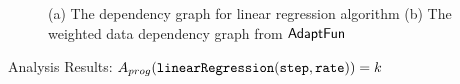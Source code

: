 \begin{example}
\begin{figure}
    \begin{subfigure}{0.3\textwidth}
    \begin{centering}
    \begin{tikzpicture}[scale=\textwidth/16cm,samples=200]
\end{tikzpicture}
    \caption{}
    \end{centering}
    \end{subfigure}
    \vspace{-0.4cm}
    \caption{(a) The dependency graph for linear regression algorithm 
    (b) The weighted data dependency graph from $\THESYSTEM$}
    \vspace{-0.2cm}
    \label{fig:linear_regression}
\end{figure}
%
Analysis Results: $ \progA(\kw{linearRegression(step, rate)}) = k$
\end{example} 
%
